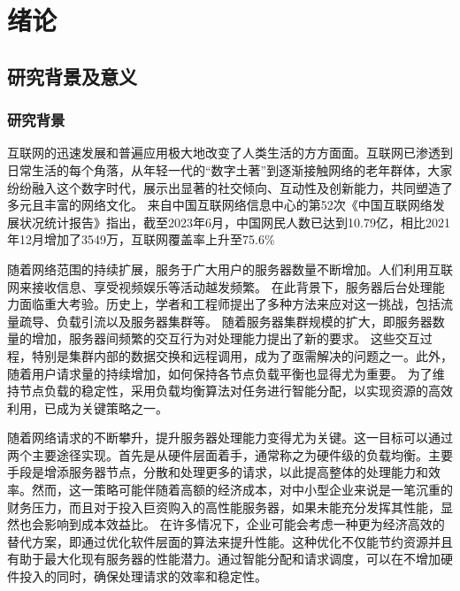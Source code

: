 \chapter{绪论}

\section{研究背景及意义}

\subsection{研究背景}

互联网的迅速发展和普遍应用极大地改变了人类生活的方方面面。互联网已渗透到日常生活的每个角落，从年轻一代的“数字土著”到逐渐接触网络的老年群体，大家纷纷融入这个数字时代，展示出显著的社交倾向、互动性及创新能力，共同塑造了多元且丰富的网络文化。
来自中国互联网络信息中心的第52次《中国互联网络发展状况统计报告》指出，截至2023年6月，中国网民人数已达到10.79亿，相比2021年12月增加了3549万，互联网覆盖率上升至75.6\%\cite{vsgohulmwhlofavjvlkltsjibcgc}

随着网络范围的持续扩展，服务于广大用户的服务器数量不断增加。人们利用互联网来接收信息、享受视频娱乐等活动越发频繁。
在此背景下，服务器后台处理能力面临重大考验。历史上，学者和工程师提出了多种方法来应对这一挑战，包括流量疏导、负载引流以及服务器集群等。
随着服务器集群规模的扩大，即服务器数量的增加，服务器间频繁的交互行为对处理能力提出了新的要求。
这些交互过程，特别是集群内部的数据交换和远程调用，成为了亟需解决的问题之一。此外，随着用户请求量的持续增加，如何保持各节点负载平衡也显得尤为重要。
为了维持节点负载的稳定性，采用负载均衡算法对任务进行智能分配，以实现资源的高效利用，已成为关键策略之一。

随着网络请求的不断攀升，提升服务器处理能力变得尤为关键。这一目标可以通过两个主要途径实现。首先是从硬件层面着手，通常称之为硬件级的负载均衡。主要手段是增添服务器节点，分散和处理更多的请求，以此提高整体的处理能力和效率。然而，这一策略可能伴随着高额的经济成本，对中小型企业来说是一笔沉重的财务压力，而且对于投入巨资购入的高性能服务器，如果未能充分发挥其性能，显然也会影响到成本效益比。
在许多情况下，企业可能会考虑一种更为经济高效的替代方案，即通过优化软件层面的算法来提升性能。这种优化不仅能节约资源并且有助于最大化现有服务器的性能潜力。通过智能分配和请求调度，可以在不增加硬件投入的同时，确保处理请求的效率和稳定性。\cite{qbee}

